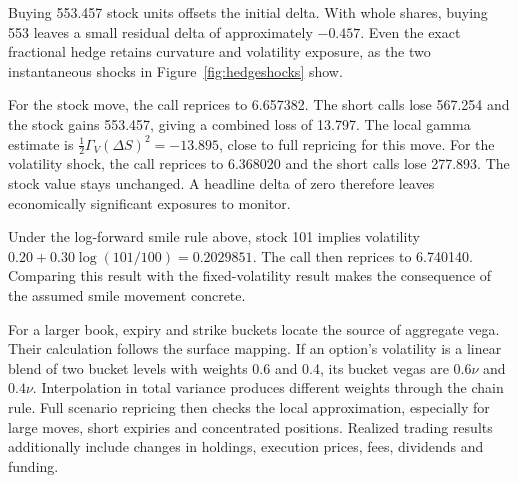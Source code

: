 \documentclass[8pt]{strategynet-journal}
\begin{document}
\begin{SNcolumns}
Buying 553.457 stock units offsets the initial delta. With whole shares, buying
553 leaves a small residual delta of approximately $-0.457$. Even the exact
fractional hedge retains curvature and volatility exposure, as the two
instantaneous shocks in Figure~\ref{fig:hedgeshocks} show.

\begin{center}\begin{minipage}{\linewidth}\centering
{}
\label{fig:hedgeshocks}
\end{minipage}\end{center}

For the stock move, the call reprices to 6.657382. The short calls lose 567.254
and the stock gains 553.457, giving a combined loss of 13.797. The local gamma
estimate is $\tfrac12\Gamma_V(\Delta S)^2=-13.895$, close to full repricing for
this move. For the volatility shock, the call reprices to 6.368020 and the short
calls lose 277.893. The stock value stays unchanged. A headline delta of zero
therefore leaves economically significant exposures to monitor.

Under the log-forward smile rule above, stock 101 implies volatility
$0.20+0.30\log(101/100)=0.2029851$. The call then reprices to 6.740140. Comparing
this result with the fixed-volatility result makes the consequence of the
assumed smile movement concrete.

For a larger book, expiry and strike buckets locate the source of aggregate
vega. Their calculation follows the surface mapping. If an option's volatility
is a linear blend of two bucket levels with weights 0.6 and 0.4, its bucket
vegas are $0.6\nu$ and $0.4\nu$. Interpolation in total variance produces different
weights through the chain rule. Full scenario repricing then checks the local
approximation, especially for large moves, short expiries and concentrated
positions. Realized trading results additionally include changes in holdings,
execution prices, fees, dividends and funding.


\end{SNcolumns}
\end{document}
